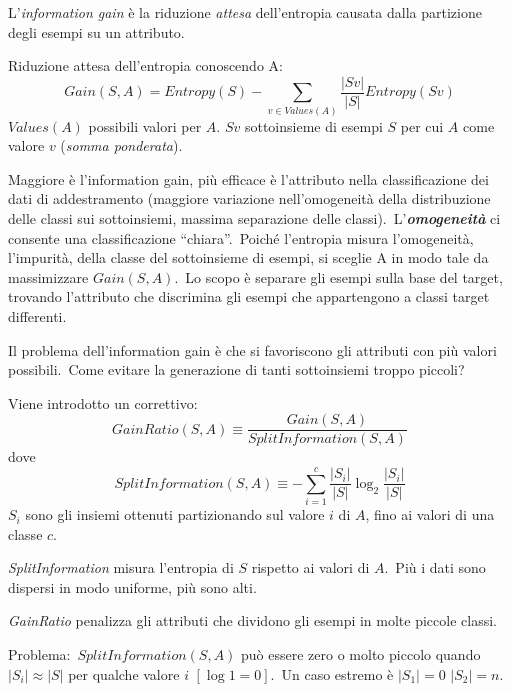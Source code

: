 \begin{definition}
	L'\textit{information gain} è la riduzione \textit{attesa} dell'entropia causata dalla partizione degli esempi su un attributo.\
\end{definition}

\noindent Riduzione attesa dell'entropia conoscendo A:
\[\mathit{Gain}(S,A) = \mathit{Entropy}(S) - \sum_{v \in \mathit{Values}(A)} \frac{|Sv|}{|S|} \mathit{Entropy}(Sv)\]
$\mathit{Values}(A)$ possibili valori per $A$.
$Sv$ sottoinsieme di esempi $S$ per cui $A$ come valore $v$ (\textit{somma ponderata}).\

\vspace{12pt}

\noindent Maggiore è l'information gain, più efficace è l'attributo nella classificazione dei dati di addestramento (maggiore variazione nell'omogeneità della distribuzione delle classi sui sottoinsiemi, massima separazione delle classi).\
L'\textbf{\textit{omogeneità}} ci consente una classificazione ``chiara''.\
Poiché l'entropia misura l'omogeneità, l'impurità, della classe del sottoinsieme di esempi, si sceglie A in modo tale da massimizzare $\mathit{Gain}(S,A)$.\
Lo scopo è separare gli esempi sulla base del target, trovando l'attributo che discrimina gli esempi che appartengono a classi target differenti.\

Il problema dell'information gain è che si favoriscono gli attributi con più valori possibili.\
Come evitare la generazione di tanti sottoinsiemi troppo piccoli?\

\vspace{12pt}
\noindent Viene introdotto un correttivo:
\[\mathit{GainRatio}(S,A) \equiv \frac{\mathit{Gain}(S,A)}{\mathit{SplitInformation}(S,A)}\]
dove
\[\mathit{SplitInformation}(S,A) \equiv - \sum_{i=1}^c \frac{|S_i|}{|S|}\log_2\frac{|S_i|}{|S|}\]
$S_i$ sono gli insiemi ottenuti partizionando sul valore $i$ di $A$, fino ai valori di una classe $c$.\

\textit{SplitInformation} misura l'entropia di $S$ rispetto ai valori di $A$.\
Più i dati sono dispersi in modo uniforme, più sono alti.\

\textit{GainRatio} penalizza gli attributi che dividono gli esempi in molte piccole classi.\

\begin{flushleft}
	Problema:\ $\mathit{SplitInformation}(S, A)$ può essere zero o molto piccolo quando $|S_i| \approx |S|$ per qualche valore $i$ $[\log 1 = 0]$.\
	Un caso estremo è $|S_1| = 0$ $|S_2| = n $.\
\end{flushleft}

